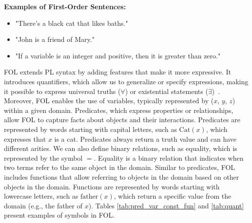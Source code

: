 \textbf{Examples of First-Order Sentences:}
\begin{itemize}
    \renewcommand{\labelitemi}{}  
    \item "There's a black cat that likes baths." 
    \item "John is a friend of Mary." 
    \item "If a variable is an integer and positive, then it is greater than zero." 
\end{itemize}  

\gls{FOL} extends \gls{PL} syntax by adding features that make it more expressive. It introduces quantifiers, which allow us to generalize or specify expressions, making it possible to express universal truths (\(\forall\)) or existential statements (\(\exists\))~\cite{huth_2004_logic}. Moreover, FOL enables the use of variables, typically represented by (\(x\), \(y\), \(z\)) within a given domain. Predicates, which express properties or relationships, allow \gls{FOL} to capture facts about objects and their interactions. Predicates are represented by words starting with capital letters, such as \( \text{Cat}(x) \), which expresses that \( x \) is a cat. Predicates always return a truth value and can have different arities. We can also define binary relations, such as equality, which is represented by the symbol \( = \). Equality is a binary relation that indicates when two terms refer to the same object in the domain. Similar to predicates, \gls{FOL} includes functions that allow referring to objects in the domain based on other objects in the domain. Functions are represented by words starting with lowercase letters, such as \( \text{father}(x) \), which return a specific value from the domain (e.g., the father of \( x \)). Tables \ref{tab:pred_var_const_fun} and \ref{tab:quant} present examples of symbols in \gls{FOL}.


\begin{table}[h!]
    \centering
    \caption{Variables, constants, predicates, and functions in First-Order Logic}
    \label{tab:pred_var_const_fun}
\end{table}

